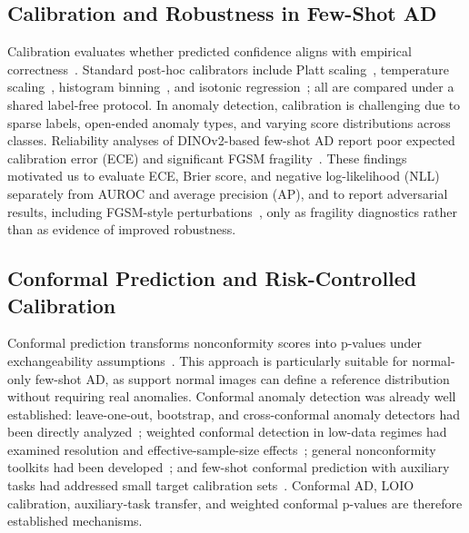 \subsection{Calibration and Robustness in Few-Shot AD}
Calibration evaluates whether predicted confidence aligns with empirical correctness~\cite{platt1999,guo2017calibration}. Standard post-hoc calibrators include Platt scaling~\cite{platt1999}, temperature scaling~\cite{guo2017calibration}, histogram binning~\cite{zadrozny2001obtaining}, and isotonic regression~\cite{zadrozny2002transforming}; all are compared under a shared label-free protocol. In anomaly detection, calibration is challenging due to sparse labels, open-ended anomaly types, and varying score distributions across classes. Reliability analyses of DINOv2-based few-shot AD report poor expected calibration error (ECE) and significant FGSM fragility~\cite{khan2025calibration}. These findings motivated us to evaluate ECE, Brier score, and negative log-likelihood (NLL) separately from AUROC and average precision (AP), and to report adversarial results, including FGSM-style perturbations~\cite{goodfellow2015}, only as fragility diagnostics rather than as evidence of improved robustness.

\subsection{Conformal Prediction and Risk-Controlled Calibration}
Conformal prediction transforms nonconformity scores into p-values under exchangeability assumptions~\cite{vovk2005,shafer2008tutorial,angelopoulos2021gentle}. This approach is particularly suitable for normal-only few-shot AD, as support normal images can define a reference distribution without requiring real anomalies. Conformal anomaly detection was already well established: leave-one-out, bootstrap, and cross-conformal anomaly detectors had been directly analyzed~\cite{hennhofer2024loio}; weighted conformal detection in low-data regimes had examined resolution and effective-sample-size effects~\cite{hennhofer2026weighted}; general nonconformity toolkits had been developed~\cite{hennhofer2026nonconform}; and few-shot conformal prediction with auxiliary tasks had addressed small target calibration sets~\cite{fisch2021fewshot}. Conformal AD, LOIO calibration, auxiliary-task transfer, and weighted conformal p-values are therefore established mechanisms.


